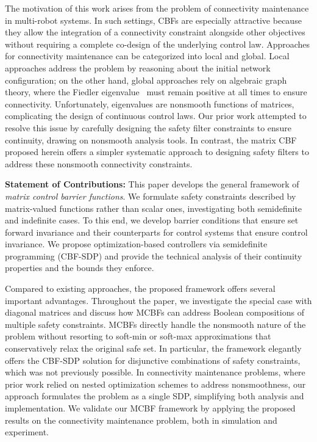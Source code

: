 \documentclass[10pt,twocolumn,twoside]{IEEEtran}
\theoremstyle{definition}
\begin{document}
The motivation of this work arises from the problem of connectivity maintenance in multi-robot systems. In such settings, CBFs are especially attractive because they allow the integration of a connectivity constraint alongside other objectives without requiring a complete co-design of the underlying control law. Approaches for connectivity maintenance can be categorized into local and global. Local approaches \cite{MJ-ME:07,MMZ-GJP:05,MDS-JC:09} address the problem by reasoning about the initial network configuration; on the other hand, global approaches \cite{BC-LS:20,PO-BC-LS-JC:23-auto} rely on algebraic graph theory, where the Fiedler eigenvalue~\cite{MF:73,CDG-GFR:01} must remain  positive at all times to ensure connectivity. Unfortunately, eigenvalues are nonsmooth functions of matrices, complicating the design of continuous control laws. Our prior work \cite{PO-BC-LS-JC:23-auto} attempted to resolve this issue by carefully designing the safety filter constraints to ensure continuity, drawing on nonsmooth analysis tools. In contrast, the matrix CBF proposed herein offers a simpler systematic approach to designing safety filters to address these nonsmooth connectivity constraints.

\textbf{Statement of Contributions:} This paper develops the general framework of \textit{matrix control barrier functions}. We formulate safety constraints described by matrix-valued functions rather than scalar ones, investigating both semidefinite and indefinite cases. To this end, we develop barrier conditions that ensure set forward invariance and their counterparts for control systems that ensure control invariance. We propose optimization-based controllers via semidefinite programming (CBF-SDP) and provide the technical analysis of their continuity properties and the bounds they enforce.

Compared to existing approaches, the proposed framework offers several important advantages. Throughout the paper, we investigate the special case with diagonal matrices and discuss how MCBFs can address Boolean compositions of multiple safety constraints. MCBFs directly handle the nonsmooth nature of the problem without resorting to soft-min or soft-max approximations that conservatively relax the original safe set. In particular, the framework elegantly offers the CBF-SDP solution for disjunctive combinations of safety constraints, which was not previously possible. In connectivity maintenance problems, where prior work relied on nested optimization schemes to address nonsmoothness, our approach formulates the problem as a single SDP, simplifying both analysis and implementation. We validate our MCBF framework by applying the proposed results on the connectivity maintenance problem, both in simulation and experiment.
\end{document}

